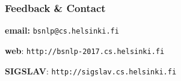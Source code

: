 \documentclass{beamer}
\begin{document}










\begin{frame}[fragile]
 \frametitle{Feedback \& Contact}

\textbf{email:} {\color{blue} \large{\verb+bsnlp@cs.helsinki.fi+}}

\vspace{1cm}

\textbf{web}: {\color{blue} \large{\verb+http://bsnlp-2017.cs.helsinki.fi+}}

\vspace{1cm}

\textbf{SIGSLAV}: {\color{blue} \large{\verb+http://sigslav.cs.helsinki.fi+}}


\end{frame}
\end{document}
